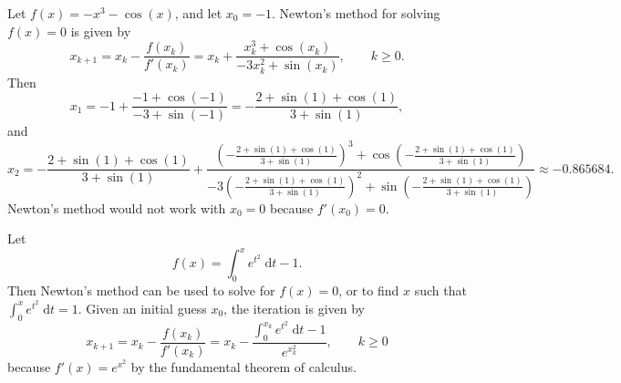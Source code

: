 \documentclass[newpage]{homework}
\begin{document}
\maketitle

\question 
\begin{alphaparts}
	\questionpart Let $f(x) = -x^3 - \cos(x)$, and let $x_0 = -1$. Newton's method for solving $f(x) =0$ is given by
	\begin{equation*}
		x_{k+1} = x_k - \frac{f(x_k)}{f'(x_k)} = x_k + \frac{x_k^3 + \cos(x_k)}{-3x_k^2 + \sin(x_k)}, \qquad k \ge 0.
	\end{equation*}
	Then
	\begin{equation*}
		x_1 = -1 + \frac{-1 + \cos(-1)}{-3 + \sin(-1)} = -\frac{2 + \sin(1) + \cos(1)}{3 + \sin(1)},
	\end{equation*}
	and
	\begin{equation*}
		x_2 = -\frac{2 + \sin(1) + \cos(1)}{3 + \sin(1)} + \frac{\left(-\frac{2 + \sin(1) + \cos(1)}{3 + \sin(1)}\right)^3 + \cos\left(-\frac{2 + \sin(1) + \cos(1)}{3 + \sin(1)}\right)}{-3\left(-\frac{2 + \sin(1) + \cos(1)}{3 + \sin(1)}\right)^2 + \sin\left(-\frac{2 + \sin(1) + \cos(1)}{3 + \sin(1)}\right)} \approx -0.865684.
	\end{equation*}
	Newton's method would not work with $x_0 = 0$ because $f'(x_0) = 0$.
	
	\questionpart Let
	\begin{equation*}
		f(x) = \int_0^xe^{t^2}\;\text{d}t - 1.
	\end{equation*}
	Then Newton's method can be used to solve for $f(x) = 0$, or to find $x$ such that $\int_0^xe^{t^2}\;\text{d}t = 1$. Given an initial guess $x_0$, the iteration is given by
	\begin{equation*}
		x_{k+1} = x_k - \frac{f(x_k)}{f'(x_k)} = x_k - \frac{\int_0^{x_k}e^{t^2}\;\text{d}t -1}{e^{x_k^2}}, \qquad k \ge 0
	\end{equation*}
	because $f'(x) = e^{x^2}$ by the fundamental theorem of calculus.
\end{alphaparts}
\end{document}
